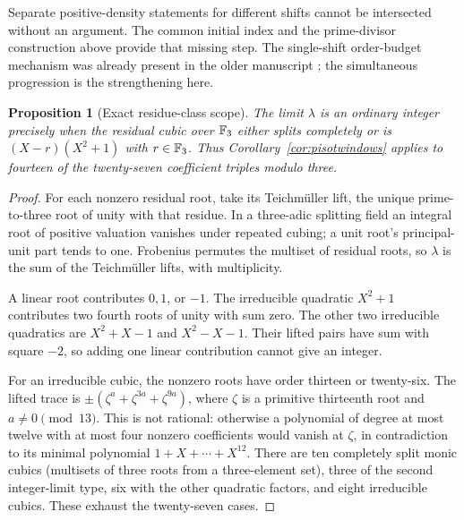 \documentclass[11pt,a4paper]{article}
\newtheorem{proposition}[theorem]{Proposition}
\theoremstyle{remark}\newtheorem{remark}[theorem]{Remark}
\begin{document}
Separate positive-density statements for different shifts cannot
be intersected without an argument. The common initial index and
the prime-divisor construction above provide that missing step.
The single-shift order-budget mechanism was already present in the
older manuscript \cite{Keio009}; the simultaneous progression is
the strengthening here.

\begin{proposition}[Exact residue-class scope]\label{prop:fourteen}
The limit $\lambda$ is an ordinary integer precisely when the
residual cubic over $\mathbb F_3$ either splits completely or is
$(X-r)(X^2+1)$ with $r\in\mathbb F_3$. Thus
Corollary~\ref{cor:pisotwindows} applies to fourteen of the
twenty-seven coefficient triples modulo three.
\end{proposition}
\begin{proof}
For each nonzero residual root, take its Teichm\"uller lift, the
unique prime-to-three root of unity with that residue. In a
three-adic splitting field an integral root of positive valuation
vanishes under repeated cubing; a unit root's principal-unit part
tends to one. Frobenius permutes the multiset of residual roots,
so $\lambda$ is the sum of the Teichm\"uller lifts, with
multiplicity.

A linear root contributes $0,1$, or $-1$. The irreducible quadratic
$X^2+1$ contributes two fourth roots of unity with sum zero. The
other two irreducible quadratics are $X^2+X-1$ and $X^2-X-1$.
Their lifted pairs have sum with square $-2$, so adding one linear
contribution cannot give an integer.

For an irreducible cubic, the nonzero roots have order thirteen or
twenty-six. The lifted trace is
$\pm(\zeta^a+\zeta^{3a}+\zeta^{9a})$, where $\zeta$ is a
primitive thirteenth root and $a\ne0\pmod{13}$. This is not
rational: otherwise a polynomial of degree at most twelve with
at most four nonzero coefficients would vanish at $\zeta$, in
contradiction to its minimal polynomial
$1+X+\cdots+X^{12}$. There are ten completely split monic cubics
(multisets of three roots from a three-element set), three of the
second integer-limit type, six with the other quadratic factors,
and eight irreducible cubics. These exhaust the twenty-seven cases.
\end{proof}
\end{document}
